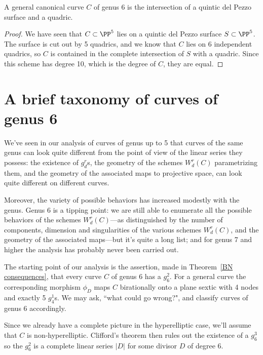 \begin{theorem}
A general canonical curve $C$ of genus 6 is the intersection of a quintic del Pezzo surface and a quadric. 
\end{theorem}

\begin{proof}
We have seen that $C \subset \PP^5$ lies on a quintic del Pezzo surface $S \subset \PP^5$. The surface is cut out by 5 quadrics, and we know that $C$ lies on 6 independent quadrics,
so $C$ is contained in the complete intersection of $S$ with a quadric. Since this scheme has degree 10, which is the degree of $C$, they are equal.
\end{proof}


\section{A brief taxonomy of curves of genus 6}

We've seen in our analysis of curves of genus up to 5 that curves of the same genus can look quite different from the point of view of the linear series they possess: the existence of $g^r_d$s,  the geometry of the schemes $W^r_d(C)$ parametrizing them, and the geometry of the associated maps to projective space, can look quite different on different curves.

Moreover, the variety of possible behaviors has increased modestly with the genus. Genus 6 is a tipping point: we are still able to enumerate all the possible behaviors of the schemes $W^r_d(C)$---as distinguished by the number of components, dimension and singularities of the various schemes $W^r_d(C)$, and the geometry of the associated maps---but it's quite a long list; and for genus 7 and higher the analysis has probably never been carried out.

The starting point of our analysis is the assertion, made in Theorem~\ref{BN consequences}, that every curve $C$ of genus 6 has  a $g^{2}_{6}$. For a general curve the corresponding morphism $\phi_{D}$ maps $C$ birationally onto a plane sextic with 4 nodes and exactly 5 $g^{1}_{4}$s. We may ask, ``what could go wrong?", and classify curves of genus 6 accordingly. 

Since we already have a complete picture in the hyperelliptic case, we'll assume that $C$ is non-hyperelliptic. Clifford's theorem then rules out
the existence of a $g^3_6$ so  the $g^2_6$ is a complete linear series  $|D|$ for some divisor $D$ of degree 6.

